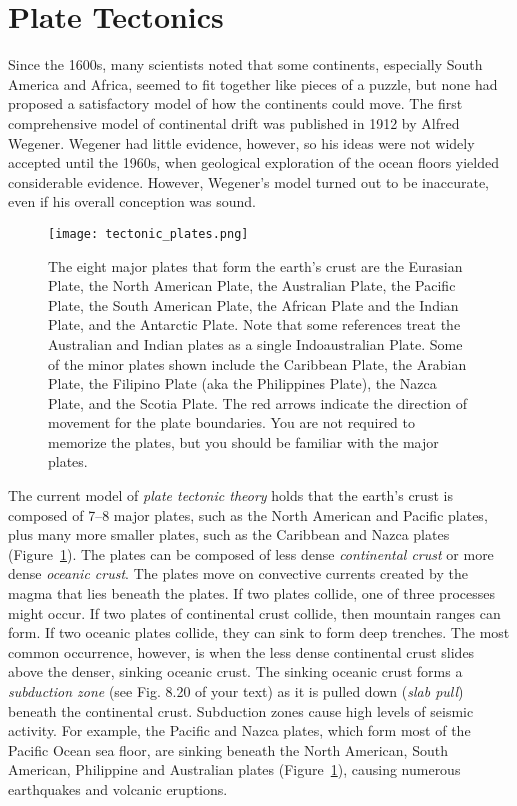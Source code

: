 \documentclass[11pt, hidelinks]{article}
\begin{document}
\section{Plate Tectonics}

Since the 1600s, many scientists noted that some continents, especially South America and Africa, seemed to fit together like pieces of a puzzle, but none had proposed a satisfactory model of how the continents could move. The first comprehensive model of continental drift was published in 1912 by Alfred Wegener. Wegener had little evidence, however, so his ideas were not widely accepted until the 1960s, when geological exploration of the ocean floors yielded considerable evidence. However, Wegener's model turned out to be inaccurate, even if his overall conception was sound.

\begin{figure}[tb]
	\centering
		\texttt{[image: tectonic\_plates.png]}  
		\caption{The eight major plates that form the earth's crust are the Eurasian Plate, the North American Plate, the Australian Plate, the Pacific Plate, the South American Plate, the African Plate and the Indian Plate, and the Antarctic Plate. Note that some references treat the Australian and Indian plates as a single Indoaustralian Plate. Some of the minor plates shown include the Caribbean Plate, the Arabian Plate, the Filipino Plate (aka the Philippines Plate), the Nazca Plate, and the Scotia Plate. The red arrows indicate the direction of movement for the plate boundaries. You are not required to memorize the plates, but you should be familiar with the major plates.\label{tectonic plates}}
		
\end{figure}

The current model of \emph{plate tectonic theory} holds that the earth's crust is composed of 7--8  major plates, such as the North American and Pacific plates, plus many more smaller plates, such as the Caribbean and Nazca plates (Figure~\ref{tectonic plates}). The plates can be composed of less dense \emph{continental crust} or more dense \emph{oceanic crust}.  The plates move on convective currents created by the magma that lies beneath the plates. If two plates collide, one of three processes might occur. If two plates of continental crust collide, then mountain ranges can form. If two oceanic plates collide, they can sink to form deep trenches. The most common occurrence, however, is when the less dense continental crust slides above the denser, sinking oceanic crust. The sinking oceanic crust forms a \emph{subduction zone} (see Fig. 8.20 of your text) as it is pulled down (\emph{slab pull}) beneath the continental crust. Subduction zones cause high levels of seismic activity. For example, the Pacific and Nazca plates, which form most of the Pacific Ocean sea floor, are sinking beneath the North American, South American, Philippine and Australian plates (Figure~\ref{tectonic plates}), causing numerous earthquakes and volcanic eruptions. 
\end{document}

